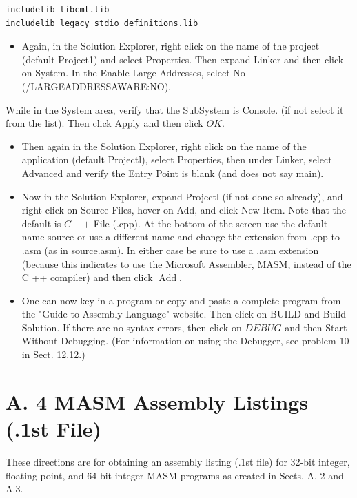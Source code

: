 \documentclass[10pt]{article}
\begin{document}
\begin{verbatim}
includelib libcmt.lib
includelib legacy_stdio_definitions.lib
\end{verbatim}

\begin{itemize}
  \item Again, in the Solution Explorer, right click on the name of the project (default Project1) and select Properties. Then expand Linker and then click on System. In the Enable Large Addresses, select No (/LARGEADDRESSAWARE:NO).
\end{itemize}

While in the System area, verify that the SubSystem is Console. (if not select it from the list). Then click Apply and then click $O K$.

\begin{itemize}
  \item Then again in the Solution Explorer, right click on the name of the application (default Projectl), select Properties, then under Linker, select Advanced and verify the Entry Point is blank (and does not say main).
  \item Now in the Solution Explorer, expand Projectl (if not done so already), and right click on Source Files, hover on Add, and click New Item. Note that the default is $C++$ File (.cpp). At the bottom of the screen use the default name source or use a different name and change the extension from .cpp to .asm (as in source.asm). In either case be sure to use a .asm extension (because this indicates to use the Microsoft Assembler, MASM, instead of the C ++ compiler) and then click $\operatorname{Add}$.
  \item One can now key in a program or copy and paste a complete program from the "Guide to Assembly Language" website. Then click on BUILD and Build Solution. If there are no syntax errors, then click on $D E B U G$ and then Start Without Debugging. (For information on using the Debugger, see problem 10 in Sect. 12.12.)
\end{itemize}

\section*{A. 4 MASM Assembly Listings (.1st File)}
These directions are for obtaining an assembly listing (.1st file) for 32-bit integer, floating-point, and 64-bit integer MASM programs as created in Sects. A. 2 and A.3.
\end{document}
